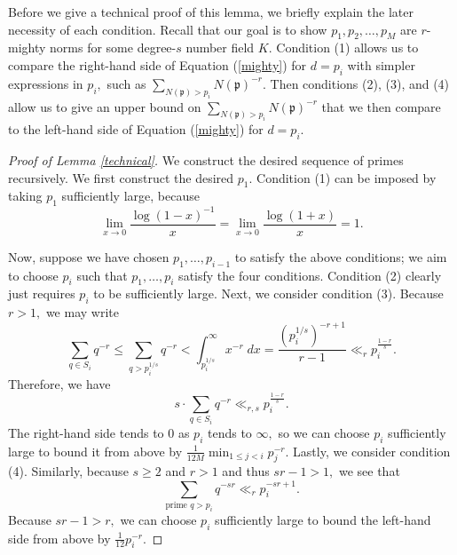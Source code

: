 \documentclass[12pt]{amsart}
\theoremstyle{definition}
\numberwithin{equation}{section}
\newcommand{\ra}{\rightarrow}
\begin{document}
Before we give a technical proof of this lemma, we briefly explain the later necessity of each condition. Recall that our goal is to show $p_1, p_2, \ldots, p_M$ are $r$-mighty norms for some degree-$s$ number field $K$.
Condition (1) allows us to compare the right-hand side of Equation (\ref{mighty}) for $d = p_i$ with simpler expressions in $p_i,$ such as $\sum_{N(\mathfrak p) > p_i} N(\mathfrak p)^{-r}.$ Then conditions (2), (3), and (4) allow us to give an upper bound on $\sum_{N(\mathfrak p) > p_i} N(\mathfrak p)^{-r}$ that we then compare to the left-hand side of Equation (\ref{mighty}) for $d = p_i.$ 

\begin{proof}[Proof of Lemma \ref{technical}]
    We construct the desired sequence of primes recursively. We first construct the desired $p_1.$ Condition (1) can be imposed by taking $p_1$ sufficiently large, because $$\lim_{x \ra 0} \frac{\log(1-x)^{-1}}{x} = \lim_{x \ra 0} \frac{\log(1+x)}{x} = 1.$$
    
    Now, suppose we have chosen $p_1, \ldots, p_{i-1}$ to satisfy the above conditions; we aim to choose $p_i$ such that $p_1,\ldots,p_{i}$ satisfy the four conditions. Condition (2) clearly just requires $p_i$ to be sufficiently large. Next, we consider condition (3). Because $r > 1,$ we may write $$\sum_{q \in S_i} q^{-r} \leq \sum_{q  > p_i^{1/s}} q^{-r} < \int_{p_i^{1/s}}^\infty x^{-r} \;dx = \frac{(p_i^{1/s})^{-r+1}}{r-1} \ll_r p_i^{\frac{1-r}{s}}.$$ Therefore, we have $$s \cdot \sum_{q \in S_i} q^{-r}  \ll_{r, s} p_i^{\frac{1-r}{s}}.$$ The right-hand side tends to 0 as $p_i$ tends to $\infty,$ so we can choose $p_i$ sufficiently large to bound it from above by $\frac{1}{12M} \min_{1 \leq j < i} p_j^{-r}.$ Lastly, we consider condition (4). Similarly, because $s \geq 2$ and $r > 1$ and thus $sr-1 > 1,$ we see that $$\sum_{\text{prime }q > p_i} q^{-sr} \ll_r p_i^{-sr+1}.$$ Because $sr-1 > r,$ we can choose $p_i$ sufficiently large to bound the left-hand side from above by $\frac{1}{12}p_i^{-r}.$
\end{proof}
\end{document}
